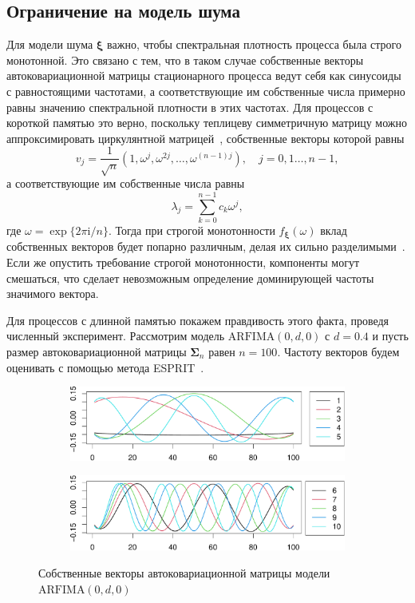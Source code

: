 \documentclass[specialist,
substylefile = spbu_report.rtx,
subf,href,colorlinks=true, 12pt]{disser}
\theoremstyle{definition}
\newtheorem{remark}{Замечание}[chapter]
\newcommand{\im}{\mathrm{i}}
\begin{document}
\subsection{Ограничение на модель шума}
Для модели шума $\bm\xi$ важно, чтобы спектральная плотность процесса была строго монотонной. Это связано с тем, что в таком случае собственные векторы автоковариационной матрицы стационарного процесса ведут себя как синусоиды с равностоящими частотами, а соответствующие им собственные числа примерно равны значению спектральной плотности в этих частотах. Для процессов с короткой памятью это верно, поскольку теплицеву симметричную матрицу можно аппроксимировать циркулянтной матрицей~\cite{Gray2005}, собственные векторы которой равны
\[
	v_j=\frac{1}{\sqrt n}\left(1, \omega^j, \omega^{2j},\ldots,\omega^{(n-1)j}\right),\quad j=0,1\ldots,n-1,
\]
а соответствующие им собственные числа равны
\[
	\lambda_j = \sum_{k=0}^{n-1}c_k\omega^{j},
\]
где $\omega=\exp\{2\pi\im / n\}$. Тогда при строгой монотонности $f_{\bm\xi}(\omega)$ вклад собственных векторов будет попарно различным, делая их сильно разделимыми~\cite[Раздел 1.5.4]{Golyandina2001}. Если же опустить требование строгой монотонности, компоненты могут смешаться, что сделает невозможным определение доминирующей частоты значимого вектора.

Для процессов с длинной памятью покажем правдивость этого факта, проведя численный эксперимент. Рассмотрим модель $\mathrm{ARFIMA}(0, d, 0)$ с $d=0.4$ и пусть размер автоковариационной матрицы $\bm\Sigma_n$ равен $n=100$. Частоту векторов будем оценивать с помощью метода \textsf{ESPRIT}~\cite[Раздел 3.1]{SSA_R}.

\begin{figure}[h]
	\begin{subfigure}{\textwidth}
		\includegraphics[width=\textwidth]{img/eigenvectors_longmemo1.pdf}
	\end{subfigure}
	\begin{subfigure}{\textwidth}
		\includegraphics[width=\textwidth]{img/eigenvectors_longmemo2.pdf}
	\end{subfigure}
	\caption{Собственные векторы автоковариационной матрицы модели $\mathrm{ARFIMA}(0, d, 0)$}
	\label{fig:eigenvectors_longmemo}
\end{figure}
\end{document}

